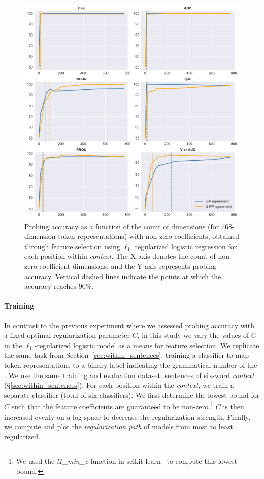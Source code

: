 \begin{figure}[htbp]
  \includegraphics[width=\columnwidth]{figures/probing_c-path.pdf}
  \caption{Probing accuracy as a function of the count of dimensions (for 768-dimension token representations)  with non-zero coefficients, obtained through feature selection using $\ell_1$ regularized logistic regression for each position within \emph{context}.
  The X-axis denotes the count of non-zero coefficient dimensions, and the Y-axis represents probing accuracy. Vertical dashed lines indicate the points at which the accuracy reaches 90\%. 
    \label{fig:res_C_path}}
\end{figure}

\paragraph{Training} In contrast to the previous experiment where we assessed probing accuracy with a fixed optimal regularization parameter $C$, in this study we vary the values of $C$ in the $\ell_1$-regularized logistic model as a means for feature selection. We replicate the same task from Section~\ref{sec:within_sentences}: training a classifier to map token representations to a binary label indicating the grammatical number of the \cue. We use the same training and evaluation dataset: sentences of six-word \emph{context} (\S\ref{sec:within_sentences}). For each position within the \emph{context}, we train a separate classifier (total of six classifiers). We first determine the lowest bound for $C$ such that the feature coefficients are guaranteed to be non-zero.\footnote{We used the \textit{l1\_min\_c} function in scikit-learn~\cite{scikit-learn} to compute this lowest bound.} $C$ is then increased evenly on a log space to decrease the regularization strength. Finally, we compute and plot the \emph{regularization path} of models from most to least regularized.
 

